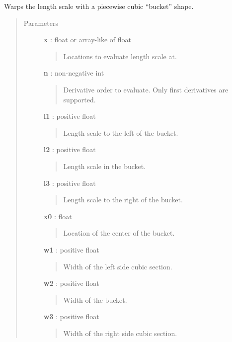 \documentclass[letterpaper,10pt,english]{sphinxmanual}
\begin{document}

\begin{fulllineitems}
\label{gptools.kernel:gptools.kernel.gibbs.cubic_bucket_warp}
Warps the length scale with a piecewise cubic ``bucket'' shape.
\begin{quote}\begin{description}
\item[{Parameters}] \leavevmode
\textbf{x} : float or array-like of float
\begin{quote}

Locations to evaluate length scale at.
\end{quote}

\textbf{n} : non-negative int
\begin{quote}

Derivative order to evaluate. Only first derivatives are supported.
\end{quote}

\textbf{l1} : positive float
\begin{quote}

Length scale to the left of the bucket.
\end{quote}

\textbf{l2} : positive float
\begin{quote}

Length scale in the bucket.
\end{quote}

\textbf{l3} : positive float
\begin{quote}

Length scale to the right of the bucket.
\end{quote}

\textbf{x0} : float
\begin{quote}

Location of the center of the bucket.
\end{quote}

\textbf{w1} : positive float
\begin{quote}

Width of the left side cubic section.
\end{quote}

\textbf{w2} : positive float
\begin{quote}

Width of the bucket.
\end{quote}

\textbf{w3} : positive float
\begin{quote}

Width of the right side cubic section.
\end{quote}

\end{description}\end{quote}

\end{fulllineitems}
\end{document}
